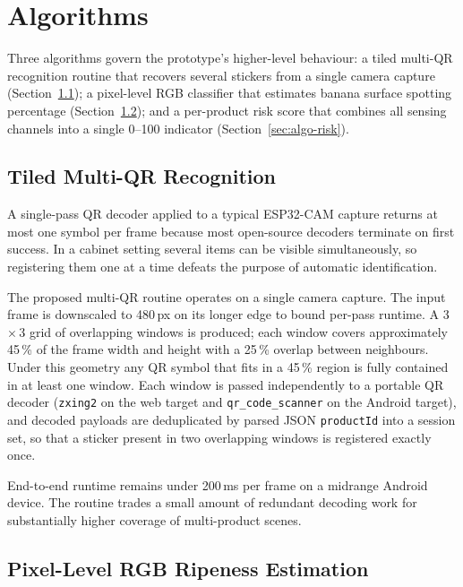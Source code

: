 \section{Algorithms}
\label{sec:algorithms}

Three algorithms govern the prototype's higher-level behaviour: a
tiled multi-QR recognition routine that recovers several stickers
from a single camera capture (Section~\ref{sec:algo-qr}); a
pixel-level RGB classifier that estimates banana surface spotting
percentage (Section~\ref{sec:algo-banana}); and a per-product risk
score that combines all sensing channels into a single 0--100
indicator (Section~\ref{sec:algo-risk}).

\subsection{Tiled Multi-QR Recognition}
\label{sec:algo-qr}

A single-pass QR decoder applied to a typical ESP32-CAM capture
returns at most one symbol per frame because most open-source
decoders terminate on first success. In a cabinet setting several
items can be visible simultaneously, so registering them one at a
time defeats the purpose of automatic identification.

The proposed multi-QR routine operates on a single camera capture.
The input frame is downscaled to 480\,px on its longer edge to bound
per-pass runtime. A 3\,$\times$\,3 grid of overlapping windows is
produced; each window covers approximately 45\,\% of the frame width
and height with a 25\,\% overlap between neighbours. Under this
geometry any QR symbol that fits in a 45\,\% region is fully
contained in at least one window. Each window is passed independently
to a portable QR decoder (\texttt{zxing2} on the web target and
\texttt{qr\_code\_scanner} on the Android target), and decoded
payloads are deduplicated by parsed JSON \texttt{productId} into a
session set, so that a sticker present in two overlapping windows is
registered exactly once.

End-to-end runtime remains under 200\,ms per frame on a midrange
Android device. The routine trades a small amount of redundant
decoding work for substantially higher coverage of multi-product
scenes.

\subsection{Pixel-Level RGB Ripeness Estimation}
\label{sec:algo-banana}

